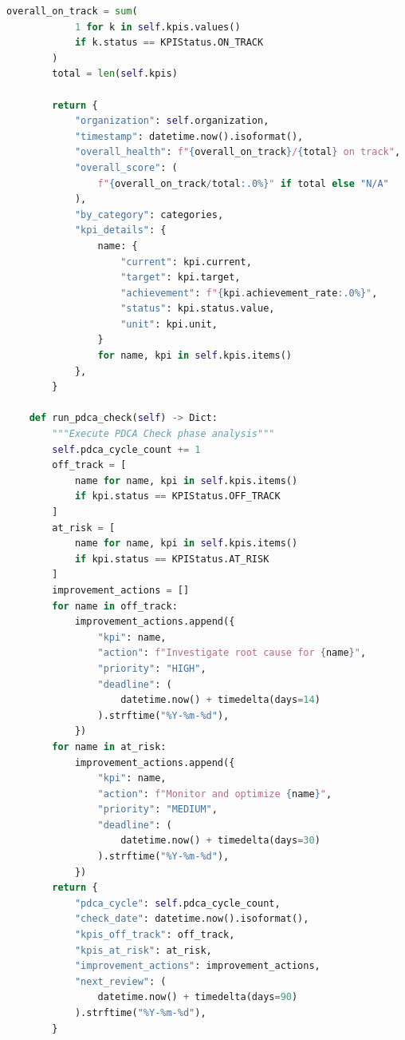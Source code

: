 \begin{lstlisting}[language=Python, caption={AI 거버넌스 KPI 대시보드}, label={lst:kpi_dashboard}]
        overall_on_track = sum(
            1 for k in self.kpis.values()
            if k.status == KPIStatus.ON_TRACK
        )
        total = len(self.kpis)

        return {
            "organization": self.organization,
            "timestamp": datetime.now().isoformat(),
            "overall_health": f"{overall_on_track}/{total} on track",
            "overall_score": (
                f"{overall_on_track/total:.0%}" if total else "N/A"
            ),
            "by_category": categories,
            "kpi_details": {
                name: {
                    "current": kpi.current,
                    "target": kpi.target,
                    "achievement": f"{kpi.achievement_rate:.0%}",
                    "status": kpi.status.value,
                    "unit": kpi.unit,
                }
                for name, kpi in self.kpis.items()
            },
        }

    def run_pdca_check(self) -> Dict:
        """Execute PDCA Check phase analysis"""
        self.pdca_cycle_count += 1
        off_track = [
            name for name, kpi in self.kpis.items()
            if kpi.status == KPIStatus.OFF_TRACK
        ]
        at_risk = [
            name for name, kpi in self.kpis.items()
            if kpi.status == KPIStatus.AT_RISK
        ]
        improvement_actions = []
        for name in off_track:
            improvement_actions.append({
                "kpi": name,
                "action": f"Investigate root cause for {name}",
                "priority": "HIGH",
                "deadline": (
                    datetime.now() + timedelta(days=14)
                ).strftime("%Y-%m-%d"),
            })
        for name in at_risk:
            improvement_actions.append({
                "kpi": name,
                "action": f"Monitor and optimize {name}",
                "priority": "MEDIUM",
                "deadline": (
                    datetime.now() + timedelta(days=30)
                ).strftime("%Y-%m-%d"),
            })
        return {
            "pdca_cycle": self.pdca_cycle_count,
            "check_date": datetime.now().isoformat(),
            "kpis_off_track": off_track,
            "kpis_at_risk": at_risk,
            "improvement_actions": improvement_actions,
            "next_review": (
                datetime.now() + timedelta(days=90)
            ).strftime("%Y-%m-%d"),
        }
\end{lstlisting}

